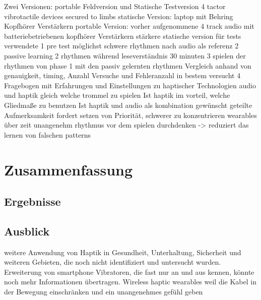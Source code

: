 \documentclass[ngerman,runningheads,a4paper]{llncs}
\begin{document}
Zwei Versionen: portable Feldversion und Statische Testversion
4 tactor vibrotactile devices secured to limbs
statische Version: laptop mit Behring Kopfhörer Verstärkern
portable Version: vorher aufgenommene 4 track audio mit batteriebetriebenen kopfhörer Verstärkern
stärkere statische version für tests verwendete
1 pre test möglichst schwere rhythmen nach audio als referenz
2 passive learning 2 rhythmen während leseverständnis 30 minuten
3 spielen der rhythmen von phase 1 mit den passiv gelernten rhythmen Vergleich anhand von genauigkeit, timing, Anzahl Versuche und Fehleranzahl in bestem versucht
4 Fragebogen mit Erfahrungen und Einstellungen zu haptischer Technologien
audio und haptik gleich welche trommel zu spielen Ist
haptik im vorteil, welche Gliedmaße zu benutzen Ist
haptik und audio als kombination gewünscht
geteilte Aufmerksamkeit fordert setzen von Priorität, schwerer zu konzentrieren
wearables über zeit unangenehm
rhythmus vor dem spielen durchdenken -> reduziert das lernen von falschen patterns



\section{Zusammenfassung}
\subsection{Ergebnisse}
\subsection{Ausblick}
weitere Anwendung von Haptik in Gesundheit, Unterhaltung, Sicherheit und weiteren Gebieten, die noch nicht identifiziert und untersucht wurden.
Erweiterung von smartphone Vibratoren, die fast nur an und aus kennen, könnte noch mehr Informationen übertragen.
Wireless haptic wearables weil die Kabel in der Bewegung einschränken und ein unangenehmes gefühl geben



\end{document}
